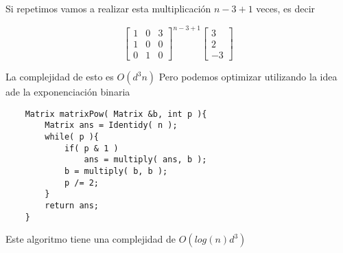 Si repetimos vamos a realizar esta multiplicación $n - 3 + 1$ veces, es decir 

\[
    {\begin{bmatrix}
        1 & 0 & 3 \\ 
        1 & 0 & 0 \\
        0 & 1 & 0
    \end{bmatrix}}^{n - 3 + 1}
    {\begin{bmatrix}
        3 \\
        2 \\
        -3
    \end{bmatrix}}
\]

La complejidad de esto es $O(d^{3}n)$ Pero podemos optimizar utilizando la idea ade la exponenciación binaria

\begin{lstlisting}
    Matrix matrixPow( Matrix &b, int p ){
        Matrix ans = Identidy( n );
        while( p ){
            if( p & 1 )
                ans = multiply( ans, b );
            b = multiply( b, b );
            p /= 2;
        }
        return ans;
    }
\end{lstlisting}

Este algoritmo tiene una complejidad de $O(log(n) d^{3})$